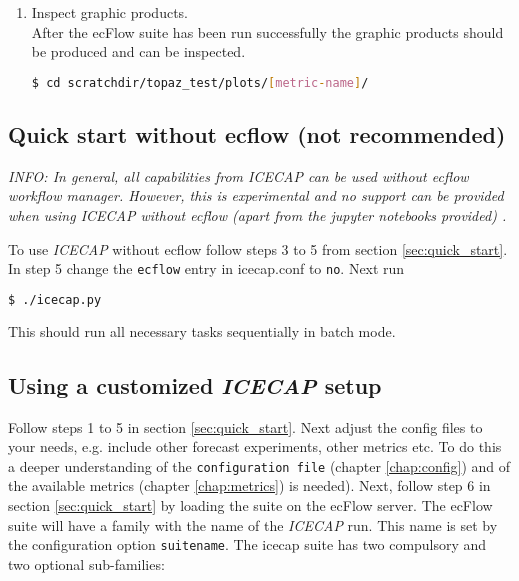 \documentclass[DIV=10, parskip=full]{scrreprt}
\newcommand{\ice}{\textit{ICECAP}\xspace}
\newcommand{\info}[1]{\textit{INFO: #1}}
\begin{document}
\begin{enumerate}
	\item Inspect graphic products.  \\
	After the ecFlow suite has been run successfully the graphic products should be produced and can be inspected.
	\begin{lstlisting}[language=bash]
		$ cd scratchdir/topaz_test/plots/[metric-name]/
	\end{lstlisting}
	
\end{enumerate}

\subsection{Quick start without ecflow (not recommended)}
\info{In general, all capabilities from \ice can be used without ecflow workflow manager. However, this is experimental and no support can be provided when using \ice without ecflow (apart from the jupyter notebooks provided) . }

To use \ice without ecflow follow steps 3 to 5 from section \ref{sec:quick_start}. In step 5 change the \texttt{ecflow} entry in icecap.conf to \texttt{no}. Next run

\begin{lstlisting}[language=bash]
	$ ./icecap.py
\end{lstlisting}

This should run all necessary tasks sequentially in batch mode. 

\subsection{Using a customized \ice setup} 
Follow steps 1 to 5 in section \ref{sec:quick_start}. Next adjust the config files to your needs, e.g. include other forecast experiments, other metrics etc. To do this a deeper understanding of the \texttt{configuration file} (chapter \ref{chap:config}) and of the available metrics (chapter \ref{chap:metrics}) is needed). Next, follow step 6 in section \ref{sec:quick_start} by loading the suite on the ecFlow server. The ecFlow suite will have a family with the name of the \ice run. This name is set by the configuration option \texttt{suitename}. The icecap suite has two compulsory and two optional sub-families:
\end{document}

